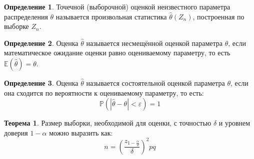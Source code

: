 \documentclass[12pt]{article}
\theoremstyle{definition}
\newtheorem{theorem}{Теорема}[section]
\newtheorem{definition}{Определение}
\newcommand{\E}{\mathbb{E}}
\newcommand{\prob}{\mathbb{P}}
\begin{document}
\begin{definition}
    Точечной (выборочной) оценкой неизвестного параметра распределения $\theta$ называется произвольная статистика $\hat{\theta}(Z_n)$, построенная по выборке $Z_n$.
\end{definition}
\begin{definition}
    Оценка $\hat{\theta}$ называется несмещённой оценкой параметра $\theta$, если математическое ожидание оценки равно оцениваемому параметру, то есть $\E(\hat{\theta})=\theta$.
\end{definition}
\begin{definition}
    Оценка $\hat{\theta}$ называется состоятельной оценкой параметра $\theta$, если она сходится по вероятности к оцениваемому параметру, то есть:
    $$\prob(|\hat{\theta}-\theta|<\varepsilon)=1$$
\end{definition}
\begin{theorem}
    Размер выборки, необходимой для оценки, с точностью $\delta$ и уровнем доверия $1-\alpha$ можно выразить как:
    $$n=\left(\frac{z_{1-\frac{\alpha}{2}}}{\delta}\right)^2pq$$
\end{theorem}
\end{document}
